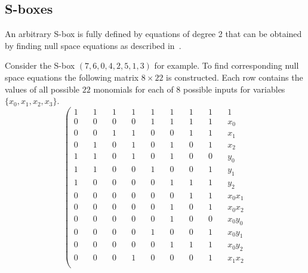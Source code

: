 \subsection{S-boxes}

An arbitrary S-box is fully defined by equations of degree 2 that can be
obtained by finding null space equations as described in~\cite{kleiman:xsl}.

Consider the S-box $(7, 6, 0, 4, 2, 5, 1, 3)$ for example. To find
corresponding null space equations the following matrix $8 \times 22$ is
constructed.  Each row contains the values of all possible $22$ monomials for
each of $8$ possible inputs for variables $\{x_0, x_1, x_2, x_3\}$.
\begin{equation}
    \label{eqn:sbox-matr}
    \left(
    \begin{array}{lllllllll}
        1 &\quad 1 &\quad 1 &\quad 1 &\quad 1 &\quad 1 &\quad 1 &\quad 1 &\quad 1       \\[-1ex]
        0 &\quad 0 &\quad 0 &\quad 0 &\quad 1 &\quad 1 &\quad 1 &\quad 1 &\quad x_0     \\[-1ex]
        0 &\quad 0 &\quad 1 &\quad 1 &\quad 0 &\quad 0 &\quad 1 &\quad 1 &\quad x_1     \\[-1ex]
        0 &\quad 1 &\quad 0 &\quad 1 &\quad 0 &\quad 1 &\quad 0 &\quad 1 &\quad x_2     \\[-1ex]
        1 &\quad 1 &\quad 0 &\quad 1 &\quad 0 &\quad 1 &\quad 0 &\quad 0 &\quad y_0     \\[-1ex]
        1 &\quad 1 &\quad 0 &\quad 0 &\quad 1 &\quad 0 &\quad 0 &\quad 1 &\quad y_1     \\[-1ex]
        1 &\quad 0 &\quad 0 &\quad 0 &\quad 0 &\quad 1 &\quad 1 &\quad 1 &\quad y_2     \\[-1ex]
        0 &\quad 0 &\quad 0 &\quad 0 &\quad 0 &\quad 0 &\quad 1 &\quad 1 &\quad x_0 x_1 \\[-1ex]
        0 &\quad 0 &\quad 0 &\quad 0 &\quad 0 &\quad 1 &\quad 0 &\quad 1 &\quad x_0 x_2 \\[-1ex]
        0 &\quad 0 &\quad 0 &\quad 0 &\quad 0 &\quad 1 &\quad 0 &\quad 0 &\quad x_0 y_0 \\[-1ex]
        0 &\quad 0 &\quad 0 &\quad 0 &\quad 1 &\quad 0 &\quad 0 &\quad 1 &\quad x_0 y_1 \\[-1ex]
        0 &\quad 0 &\quad 0 &\quad 0 &\quad 0 &\quad 1 &\quad 1 &\quad 1 &\quad x_0 y_2 \\[-1ex]
        0 &\quad 0 &\quad 0 &\quad 1 &\quad 0 &\quad 0 &\quad 0 &\quad 1 &\quad x_1 x_2 \\[-1ex]

\end{array}
\end{equation}
